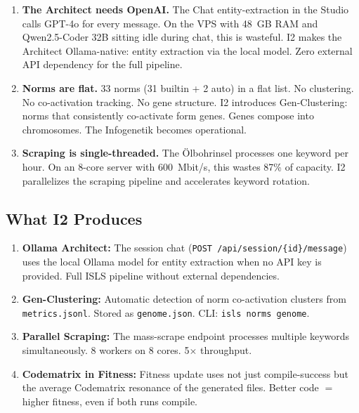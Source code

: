 \documentclass[11pt,a4paper]{article}
\begin{document}
\begin{enumerate}[nosep]
\item \textbf{The Architect needs OpenAI.} The Chat entity-extraction 
      in the Studio calls GPT-4o for every message. On the VPS with 
      48~GB RAM and Qwen2.5-Coder 32B sitting idle during chat, this 
      is wasteful. I2 makes the Architect Ollama-native: entity 
      extraction via the local model. Zero external API dependency 
      for the full pipeline.
\item \textbf{Norms are flat.} 33 norms (31 builtin + 2 auto) in 
      a flat list. No clustering. No co-activation tracking. No 
      gene structure. I2 introduces Gen-Clustering: norms that 
      consistently co-activate form genes. Genes compose into 
      chromosomes. The Infogenetik becomes operational.
\item \textbf{Scraping is single-threaded.} The \"Olbohrinsel 
      processes one keyword per hour. On an 8-core server with 
      600~Mbit/s, this wastes 87\% of capacity. I2 parallelizes 
      the scraping pipeline and accelerates keyword rotation.
\end{enumerate}

\subsection{What I2 Produces}

\begin{enumerate}[nosep]
\item \textbf{Ollama Architect:} The session chat 
      (\texttt{POST /api/session/\{id\}/message}) uses the local 
      Ollama model for entity extraction when no API key is 
      provided. Full ISLS pipeline without external dependencies.
\item \textbf{Gen-Clustering:} Automatic detection of norm 
      co-activation clusters from \texttt{metrics.jsonl}. 
      Stored as \texttt{genome.json}. CLI: \texttt{isls norms 
      genome}.
\item \textbf{Parallel Scraping:} The mass-scrape endpoint 
      processes multiple keywords simultaneously. 8 workers 
      on 8 cores. 5$\times$ throughput.
\item \textbf{Codematrix in Fitness:} Fitness update uses 
      not just compile-success but the average Codematrix 
      resonance of the generated files. Better code $=$ higher 
      fitness, even if both runs compile.
\end{enumerate}
\end{document}
